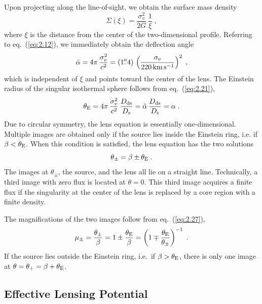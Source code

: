 \documentclass[a4paper,10pt]{article} %
\newcommand{\farcs}{\hbox{$.\!\!^{\prime\prime}$}}
\begin{document}
Upon projecting along the line-of-sight, we obtain the surface mass
density
\begin{equation}
  \Sigma(\xi) = \frac{\sigma_v^2}{2G}\,\frac{1}{\xi}\;,
\label{eq:3.6}
\end{equation}
where $\xi$ is the distance from the center of the two-dimensional
profile. Referring to eq.\ (\ref{eq:2.12}), we immediately obtain the
deflection angle
\begin{equation}
  \hat\alpha = 4\pi\,\frac{\sigma_v^2}{c^2} = (1\farcs4)\,
  \left(\frac{\sigma_v}{220\,{\rm km}\,{\rm s}^{-1}}\right)^2\;,
\label{eq:3.7}
\end{equation}
which is independent of $\xi$ and points toward the center of the
lens. The Einstein radius of the singular isothermal sphere follows
from eq.\ (\ref{eq:2.21}),
\begin{equation}
  \theta_{\rm E} = 4\pi\,\frac{\sigma_v^2}{c^2}\,
  \frac{D_{\rm ds}}{D_{\rm s}} =
  \hat\alpha\,\frac{D_{\rm ds}}{D_{\rm s}} = \alpha\;.
\label{eq:3.8}
\end{equation}
Due to circular symmetry, the lens equation is essentially
one-dimensional. Multiple images are obtained only if the source lies
inside the Einstein ring, i.e. if $\beta<\theta_{\rm E}$. When this
condition is satisfied, the lens equation has the two solutions
\begin{equation}
  \theta_\pm = \beta\pm\theta_{\rm E}\;.
\label{eq:3.9}
\end{equation}
The images at $\theta_\pm$, the source, and the lens all lie on a
straight line. Technically, a third image with zero flux is located at
$\theta=0$. This third image acquires a finite flux if the singularity
at the center of the lens is replaced by a core region with a finite
density.

The magnifications of the two images follow from eq.\ (\ref{eq:2.27}),
\begin{equation}
  \mu_\pm = \frac{\theta_\pm}{\beta} =
  1\pm\frac{\theta_{\rm E}}{\beta} =
  \left(1\mp\frac{\theta_{\rm E}}{\theta_\pm}\right)^{-1}\;.
\label{eq:3.10}
\end{equation}
If the source lies outside the Einstein ring, i.e.\ if
$\beta>\theta_{\rm E}$, there is only one image at
$\theta=\theta_+=\beta+\theta_{\rm E}$.

\subsection{Effective Lensing Potential}
\label{NB:subsect3.2}
\end{document}
